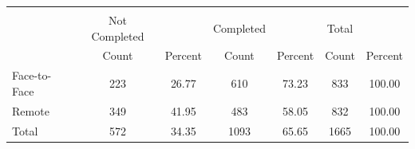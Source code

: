 {
\def\sym#1{\ifmmode^{#1}\else\(^{#1}\)\fi}
\begin{tabular}{l*{3}{cc}}
\hline\hline
            &\multicolumn{6}{c}{}                                                                           \\
            &  Not Completed&               &      Completed&               &          Total&               \\
            &          Count&        Percent&          Count&        Percent&          Count&        Percent\\
\hline
Face-to-Face&            223&          26.77&            610&          73.23&            833&         100.00\\
Remote      &            349&          41.95&            483&          58.05&            832&         100.00\\
Total       &            572&          34.35&           1093&          65.65&           1665&         100.00\\
\hline\hline
\end{tabular}
}
